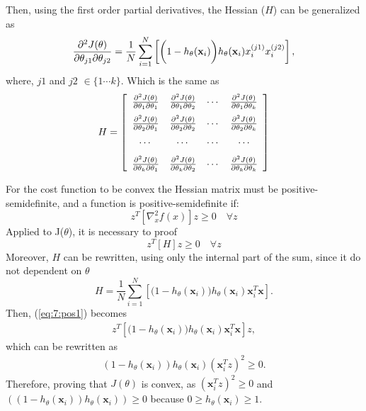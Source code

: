 Then, using the first order partial derivatives, the Hessian ($H$) can be generalized as
\begin{equation}
  \frac{\partial^2 J(\theta)}{\partial\theta_{j1}\partial\theta_{j2}}=\frac{1}{N}\sum_{i=1}^{N}
  \left[\bigg(1-h_\theta(\mathbf{x}_i)\bigg)h_\theta(\mathbf{x}_i)x_i^{(j1)}x_i^{(j2)}\right],
\end{equation}
where, $j1$ and $j2$ $\in \{1\cdots k\}$. Which is the same as
\begin{equation}
H=\left[ \begin{array}{cccc}
  \frac{\partial^2 J(\theta)}{\partial\theta_{1}\partial\theta_{1}} & \frac{\partial^2 J(\theta)}{\partial\theta_{1}\partial\theta_{2}} & \cdots & \frac{\partial^2 J(\theta)}{\partial\theta_{1}\partial\theta_{k}} \\[0.1in]  
  \frac{\partial^2 J(\theta)}{\partial\theta_{2}\partial\theta_{1}} & \frac{\partial^2 J(\theta)}{\partial\theta_{2}\partial\theta_{2}} & \cdots & \frac{\partial^2 J(\theta)}{\partial\theta_{2}\partial\theta_{k}} \\[0.1in]  
  \cdots & \cdots & \cdots & \cdots \\[0.1in]  
  \frac{\partial^2 J(\theta)}{\partial\theta_{k}\partial\theta_{1}} & \frac{\partial^2 J(\theta)}{\partial\theta_{k}\partial\theta_{2}} & \cdots & \frac{\partial^2 J(\theta)}{\partial\theta_{k}\partial\theta_{k}}  
\end{array} \right]
\end{equation}

For the cost function to be convex the Hessian matrix	must be positive-semidefinite, and
a function is positive-semidefinite if:  
\begin{equation}
  z^T\left[\nabla_x^2f(x)\right]z \ge 0 \quad  \forall z
\end{equation}
Applied to J($\theta$), it is necessary to proof
\begin{equation}\label{eq:7:pos1}
  z^T\left[H \right]z \ge 0 \quad  \forall z
\end{equation}
Moreover, $H$ can be rewritten, using only the internal part of the sum, since it do not 
dependent on $\theta$
\begin{equation}
 H = \frac{1}{N}\sum_{i=1}^{N} \left[ 
\bigg(1-h_\theta(\mathbf{x}_i)\bigg)h_\theta(\mathbf{x}_i)\mathbf{x}_i^T \mathbf{x} \right]. 
\end{equation}
Then, (\ref{eq:7:pos1}) becomes
\begin{align}
  z^T \left[\bigg(1-h_\theta(\mathbf{x}_i)\bigg)h_\theta(\mathbf{x}_i)\mathbf{x}_i^T 
\mathbf{x}\right] z,
\end{align}
which can be rewritten as
\begin{align}
  (1-h_\theta(\mathbf{x}_i))h_\theta(\mathbf{x}_i)\left(\mathbf{x}_i^Tz\right)^2 \ge 0.
\end{align}
Therefore, proving that $J(\theta)$ is convex, as $\left(\mathbf{x}_i^Tz\right)^2 
\ge 0$ and \\ $\left((1-h_\theta(\mathbf{x}_i))h_\theta(\mathbf{x}_i)\right)\ge 0$ because $0\ge 
h_\theta(\mathbf{x}_i) \ge 1$.


